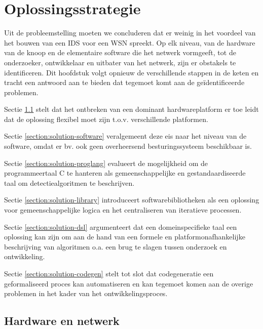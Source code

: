 
\chapter{Oplossingsstrategie}
\label{chapter:oplossingsstrategie}

Uit de probleemstelling moeten we concluderen dat er weinig in het voordeel van
het bouwen van een IDS voor een WSN spreekt. Op elk niveau, van de hardware van
de knoop en de elementaire software die het netwerk vormgeeft, tot de
onderzoeker, ontwikkelaar en uitbater van het netwerk, zijn er obstakels te
identificeren. Dit hoofdstuk volgt opnieuw de verschillende stappen in de keten
en tracht een antwoord aan te bieden dat tegemoet komt aan de
ge\"identificeerde problemen.

Sectie \ref{section:solution-node-wsn} stelt dat het ontbreken van een dominant
hardwareplatform er toe leidt dat de oplossing flexibel moet zijn t.o.v.
verschillende platformen.

Sectie \ref{section:solution-software} veralgemeent deze eis naar het niveau
van de software, omdat er bv. ook geen overheersend besturingssysteem
beschikbaar is.

Sectie \ref{section:solution-proglang} evalueert de mogelijkheid om de
programmeertaal C te hanteren als gemeenschappelijke en gestandaardiseerde taal
om detectiealgoritmen te beschrijven.

Sectie \ref{section:solution-library} introduceert softwarebibliotheken als een
oplossing voor gemeenschappelijke logica en het centraliseren van iteratieve
processen.

Sectie \ref{section:solution-dsl} argumenteert dat een domeinspecifieke taal
een oplossing kan zijn om aan de hand van een formele en platformonafhankelijke
beschrijving van algoritmen o.a. een brug te slagen tussen onderzoek en
ontwikkeling.

Sectie \ref{section:solution-codegen} stelt tot slot dat codegeneratie een
geformaliseerd proces kan automatiseren en kan tegemoet komen aan de overige
problemen in het kader van het ontwikkelingsproces.

\vspace{-3mm}

\section{Hardware en netwerk}
\label{section:solution-node-wsn}

